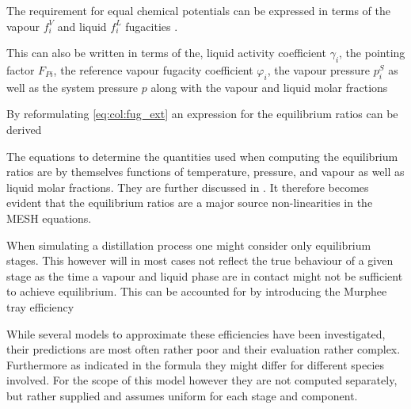        The requirement for equal chemical potentials can be expressed in terms of the vapour $f_i^V$
        and liquid $f_i^L$ fugacities \cite{AndreasPfennig.2003}.

        This can also be written in terms of the, liquid activity coefficient $\gamma_i$,
        the pointing factor $F_{Pi}$, the reference vapour fugacity coefficient $\varphi_i$,
        the vapour pressure $p^S_i$ as well as the system pressure $p$ along with the vapour and
        liquid molar fractions

        By reformulating \eqref{eq:col:fug_ext} an expression for the equilibrium ratios
        can be derived

        The equations to determine the quantities used when computing the equilibrium ratios are by
        themselves functions of temperature, pressure, and vapour as well as liquid molar fractions.
        They are further discussed in . It therefore becomes evident that the
        equilibrium ratios are a major source  non-linearities in the MESH equations.

        When simulating a distillation process one might consider only equilibrium stages. This however
        will in most cases not reflect the true behaviour of a given stage as the time a vapour and
        liquid phase are in contact might not be sufficient to achieve equilibrium. This can be accounted
        for by introducing the Murphee tray efficiency \cite{Henley.op.2011}

        While several models to approximate these efficiencies have been investigated, their predictions are
        most often rather poor \cite{Coulson.1999} and their evaluation rather complex. Furthermore as indicated
        in the formula they might differ for different species involved. For the scope of this model however
        they are not computed separately, but rather supplied and assumes uniform for each stage and component.

